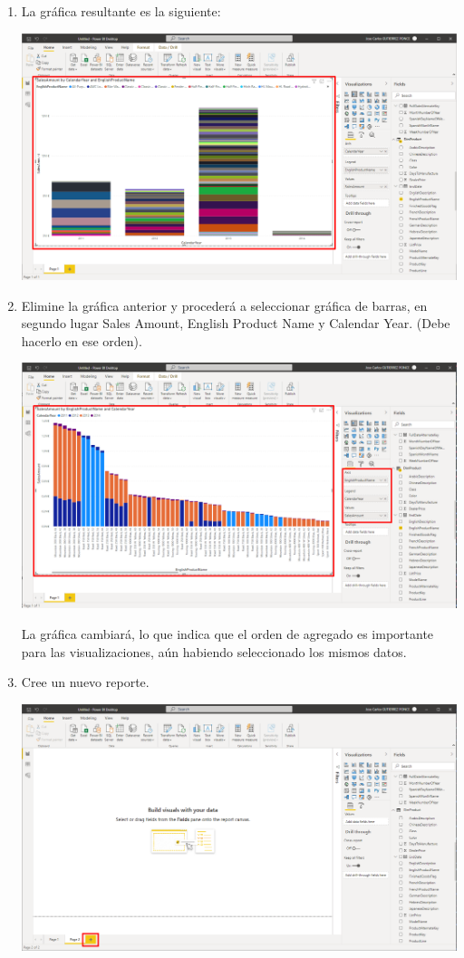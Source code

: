 \documentclass{article}
\begin{document}
\begin{enumerate}[\tab 1.]
        \item La gráfica resultante es la siguiente:
        \begin{center}
            \includegraphics[width=13cm]{./images/6.png}
        \end{center}
        \newpage
        \item Elimine la gráfica anterior y procederá a seleccionar gráfica de barras, en segundo lugar Sales Amount, English Product Name y Calendar Year. (Debe hacerlo en ese orden).
        \begin{center}
            \includegraphics[width=13cm]{./images/7.png}
        \end{center}
        La gráfica cambiará, lo que indica que el orden de agregado es importante para las visualizaciones, aún habiendo seleccionado los mismos datos.          
        \item Cree un nuevo reporte.
        \begin{center}
            \includegraphics[width=13cm]{./images/8.png}

\end{center}
\end{enumerate}
\end{document}
